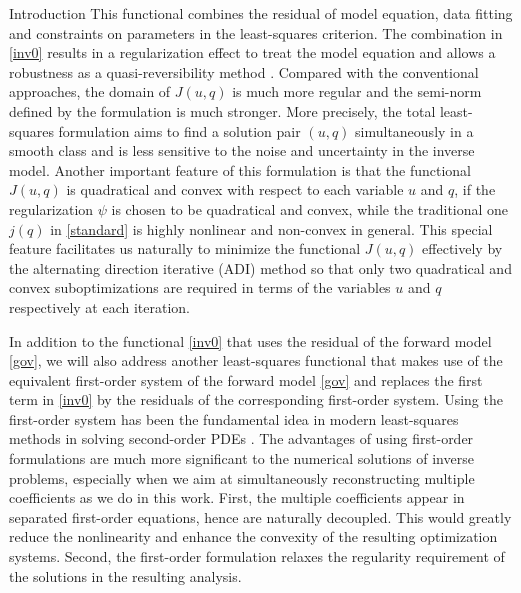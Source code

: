 \documentclass[11pt]{article}%
\renewcommand{\_}{{\fontfamily{ptm}\selectfont\textunderscore}}
\theoremstyle{plain}
\numberwithin{equation}{section}
\begin{document}
\begin{section}{Introduction}
This functional combines the residual of model equation,
data fitting and constraints on parameters in the least-squares criterion. The combination in \eqref{inv0} results in a regularization effect to treat the model equation and allows a robustness as a quasi-reversibility method \cite{lattes1969method}.
Compared with the conventional approaches, the domain of $J(u,q)$ is much more regular and the semi-norm defined by the formulation is much stronger. More precisely, the total least-squares formulation aims to find a solution pair $(u,q)$ simultaneously in a smooth class and is less sensitive to the noise and uncertainty in the inverse model.
Another important feature of this formulation is that the functional $J(u,q)$ is quadratical and convex with respect to each variable 
$u$ and $q$, if the regularization $\psi$ is chosen to be quadratical and convex, while the traditional one $j(q)$ in \eqref{standard} is highly nonlinear and non-convex in general. 
This special feature facilitates us naturally to minimize the functional $J(u,q)$ effectively by the alternating direction iterative (ADI) 
method \cite{CsiszarAM1984, byrne2014iterative} so that only two quadratical and convex suboptimizations are required in terms of the variables $u$ and $q$ respectively at each iteration. 



In addition to the functional \eqref{inv0} that uses the residual of the forward model \eqref{gov}, we will also 
address another least-squares functional that makes use of the equivalent first-order system of the forward model \eqref{gov} and replaces the first term in \eqref{inv0} by the residuals of the corresponding first-order system. 
Using the first-order system has been the fundamental idea in modern least-squares methods in solving second-order PDEs \cite{jespersen1977least, bochev1998finite, pehlivanov1994least}.
The advantages of using first-order formulations are much more significant to the numerical solutions of inverse problems, 
especially when we aim at simultaneously reconstructing multiple coefficients as we do in this work. 
First, the multiple coefficients appear in separated first-order equations, hence are naturally decoupled. This would 
greatly reduce the nonlinearity and enhance the convexity of the resulting optimization systems. 
Second, the first-order formulation relaxes the regularity requirement of the solutions in the resulting analysis. 



\end{section}
\end{document}
